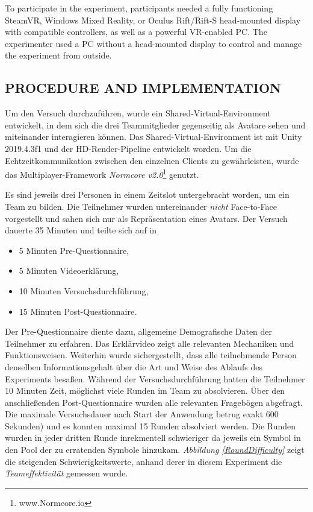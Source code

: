 \documentclass[sigchi]{acmart}
\begin{document}
To participate in the experiment, participants needed a fully functioning SteamVR, Windows Mixed Reality, or Oculus Rift/Rift-S head-mounted display with compatible controllers, as well as a powerful VR-enabled PC. The experimenter used a PC without a head-mounted display to control and manage the experiment from outside.

\subsection{PROCEDURE AND IMPLEMENTATION}
Um den Versuch durchzuführen, wurde ein Shared-Virtual-Environment entwickelt, in dem sich die drei Teammitglieder gegenseitig als Avatare sehen und miteinander interagieren können. Das Shared-Virtual-Environment ist mit Unity 2019.4.3f1 und der HD-Render-Pipeline entwickelt worden. Um die Echtzeitkommunikation zwischen den einzelnen Clients zu gewährleisten, wurde das Multiplayer-Framework \textit{Normcore v2.0}\footnote{www.Normcore.io} genutzt.

Es sind jeweils drei Personen in einem Zeitslot untergebracht worden, um ein Team zu bilden. Die Teilnehmer wurden untereinander \textit{nicht} Face-to-Face vorgestellt und sahen sich nur als Repräsentation eines Avatars.
Der Versuch dauerte 35 Minuten und teilte sich auf in
		\begin{itemize}
			\item 5 Minuten Pre-Questionnaire,
			\item 5 Minuten Videoerklärung,
			\item 10 Minuten Versuchsdurchführung,
			\item 15 Minuten Post-Questionnaire.
		\end{itemize}
Der Pre-Questionnaire diente dazu, allgemeine Demografische Daten der Teilnehmer zu erfahren. Das Erklärvideo zeigt alle relevanten Mechaniken und Funktionsweisen. Weiterhin wurde sichergestellt, dass alle teilnehmende Person denselben Informationsgehalt über die Art und Weise des Ablaufs des Experiments besaßen. Während der Versuchsdurchführung hatten die Teilnehmer 10 Minuten Zeit, möglichst viele Runden im Team zu absolvieren. Über den anschließenden Post-Questionnaire wurden alle relevanten Fragebögen abgefragt. Die maximale Versuchsdauer nach Start der Anwendung betrug exakt 600 Sekunden) und es konnten maximal 15 Runden absolviert werden. Die Runden wurden in jeder dritten Runde inrekmentell schwieriger da jeweils ein Symbol in den Pool der zu erratenden Symbole hinzukam.
 \textit{Abbildung \ref{RoundDifficulty}} zeigt die steigenden Schwierigkeitswerte, anhand derer in diesem Experiment die \textit{Teameffektivität} gemessen wurde.
\end{document}
